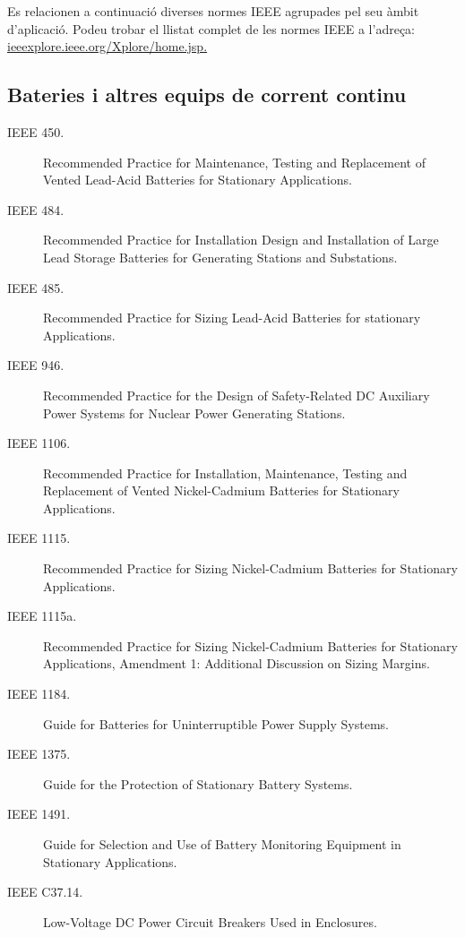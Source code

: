Es relacionen a continuació diverses normes IEEE agrupades pel seu àmbit d'aplicació. Podeu trobar el llistat complet de les normes IEEE a l'adreça: \href{http://ieeexplore.ieee.org/Xplore/home.jsp}{ieeexplore.ieee.org/Xplore/home.jsp.}

\subsection*{Bateries i altres equips de corrent continu}
\begin{description}
    \item [\hspace{5mm}IEEE 450.] Recommended Practice for  Maintenance, Testing and Replacement of Vented Lead-Acid Batteries for Stationary Applications.
    \item [\hspace{5mm}IEEE 484.] Recommended Practice for Installation Design and Installation of Large Lead Storage Batteries for Generating Stations and Substations.
    \item [\hspace{5mm}IEEE 485.] Recommended Practice for Sizing Lead-Acid Batteries for stationary Applications.
    \item [\hspace{5mm}IEEE 946.] Recommended Practice for the Design of Safety-Related DC Auxiliary Power Systems for Nuclear Power Generating Stations.
    \item [\hspace{5mm}IEEE 1106.] Recommended Practice for Installation, Maintenance, Testing and Replacement of Vented Nickel-Cadmium Batteries for Stationary Applications.
    \item [\hspace{5mm}IEEE 1115.] Recommended Practice for Sizing Nickel-Cadmium Batteries for Stationary Applications.
    \item [\hspace{5mm}IEEE 1115a.] Recommended Practice for Sizing Nickel-Cadmium Batteries for Stationary Applications, Amendment 1: Additional Discussion on Sizing Margins.
    \item [\hspace{5mm}IEEE 1184.] Guide for Batteries for Uninterruptible Power Supply Systems.
    \item [\hspace{5mm}IEEE 1375.] Guide for the Protection of Stationary Battery Systems.
    \item [\hspace{5mm}IEEE 1491.] Guide for Selection and Use of Battery Monitoring Equipment in Stationary Applications.
    \item [\hspace{5mm}IEEE C37.14.] Low-Voltage DC Power Circuit Breakers Used in Enclosures.
\end{description}


